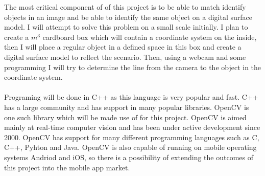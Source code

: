 \documentclass{article}
\begin{document}
The most critical component of of this project is to be able to match identify objects in an image and be able to identify the same object on a digital surface model. I will attempt to solve this problem on a small scale initially. I plan to create a $m^3$ cardboard box which will contain a coordinate system on the inside, then I will place a regular object in a defined space in this box and create a digital surface model to reflect the scenario. Then, using a webcam and some programming I will try to determine the line from the camera to the object in the coordinate system.

\paragraph{}
Programing will be done in C++ as this language is very popular and fast. C++ has a large community and has support in many popular libraries. OpenCV is one such library which will be made use of for this project. OpenCV is aimed mainly at real-time computer vision and has been under active development since 2000. OpenCV has support for many different programming languages such as C, C++, Pyhton and Java. OpenCV is also capable of running on mobile operating systems Andriod and iOS, so there is a possibility of extending the outcomes of this project into the mobile app market.
\end{document}
